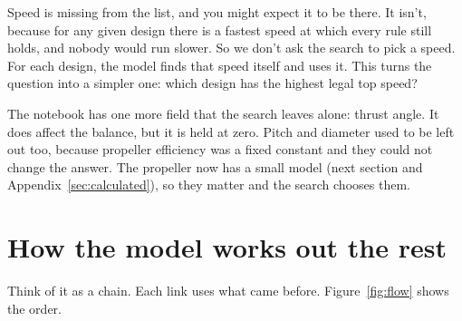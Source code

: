 \documentclass[11pt,a4paper]{article}
\renewcommand{\_}{\textunderscore\allowbreak}
\begin{document}
Speed is missing from the list, and you might expect it to be there. It isn't, because for any given design there is a fastest speed at which every rule
still holds, and nobody would run slower. So we don't ask the search to pick a speed. For each design, the model finds that speed itself and uses it.
This turns the question into a simpler one: which design has the highest legal top speed?

The notebook has one more field that the search leaves alone: thrust angle. It does affect the balance, but it is held at zero.
Pitch and diameter used to be left out too, because propeller efficiency was a fixed constant and they could not change the answer. The propeller now has a small model
(next section and Appendix~\ref{sec:calculated}), so they matter and the search chooses them.

\section*{How the model works out the rest}

Think of it as a chain. Each link uses what came before. Figure~\ref{fig:flow} shows the order.
\end{document}
